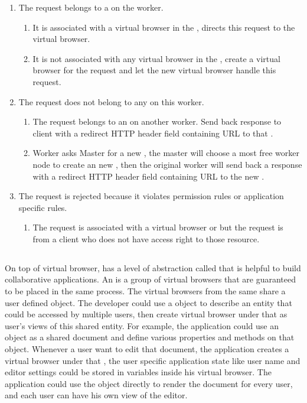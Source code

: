 \begin{enumerate}
    \item The request belongs to a \appins{} on the worker.
    \begin{enumerate}
        \item It is associated with a virtual browser in the \appins{}, directs this request to the virtual browser.
        \item It is not associated with any virtual browser in the \appins{}, create a virtual browser for the request
        and let the new virtual browser handle this request.
    \end{enumerate}

    \item The request does not belong to any \appins{} on this worker.
    \begin{enumerate}
        \item The request belongs to an \appins{} on another worker.
        Send back response to client with a redirect HTTP header field
        containing URL to that \appins{}.
        \item Worker asks Master for a new \appins{},
        the master will choose a most free worker node to create an new \appins{},
        then the original worker will send back a response with a redirect HTTP header field
        containing URL to the new \appins{}.
    \end{enumerate}

    \item The request is rejected because it violates permission rules or application specific rules.
    \begin{enumerate}
        \item The request is associated with a virtual browser or \appins{} but
        the request is from a client who does not have access right to those resource.
    \end{enumerate}
\end{enumerate}

\subsection{\appins{}}
\label{sec:appins}
On top of virtual browser, 
\cb{} has a level of abstraction called \appins{} that is helpful
to build collaborative applications.
An \appins{} is a group of virtual browsers that are guaranteed to be placed
in the same \cb{} process.
The virtual browsers from the same \appins{} share a user defined \appins{} object.
The developer could use a \appins{} object to describe an entity that 
could be accessed by multiple users, 
then create virtual browser under that \appins{} as user's views of this shared entity.
For example, the application could use an \appins{} object as a shared document and 
define various properties and methods on that object.
Whenever a user want to edit that document, the application
creates a virtual browser under that \appins{},
the user specific application state like user name and editor settings 
could be stored in variables inside his virtual browser.
The application could use the \appins{} object directly to render the document for every user, 
and each user can have his own view of the editor.


